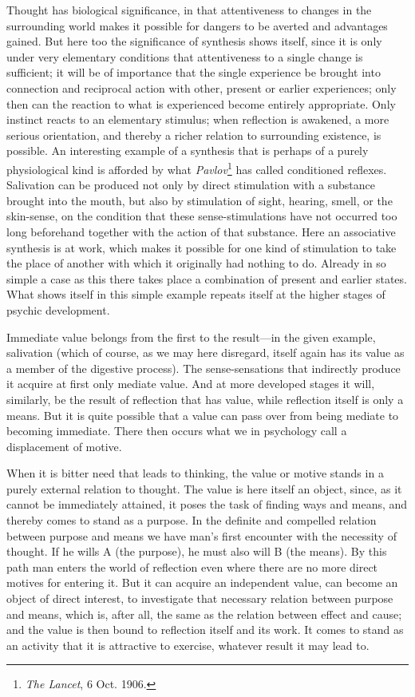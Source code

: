 \documentclass[12pt,a4paper]{book}
\newcommand{\opage}[1]{\marginnote{\footnotesize\textit{[#1]}}}
\begin{document}
Thought has biological significance, in that attentiveness to changes in
the surrounding world makes it possible for dangers to be averted and
advantages gained. But here too the significance of synthesis shows
itself, since it is only under very elementary conditions that
attentiveness to a single change is sufficient; it will be of importance
that the single experience be brought into connection and reciprocal
action with other, present or earlier experiences; only then can the
reaction to what is experienced become entirely appropriate. Only
instinct reacts to an elementary stimulus; when reflection is awakened,
a more serious orientation, and thereby a richer relation to surrounding
existence, is possible. An interesting example of a synthesis that is
perhaps of a purely physiological kind is afforded by what
\emph{Pavlov}\footnote{\emph{The Lancet}, 6 Oct. 1906.} has called
conditioned reflexes. Salivation can be produced not only by direct
stimulation with a substance brought into the mouth, but also by
stimulation of sight, hearing, \opage{21}smell, or the skin-sense, on the
condition that these sense-stimulations have not occurred too long
beforehand together with the action of that substance. Here an
associative synthesis is at work, which makes it possible for one kind
of stimulation to take the place of another with which it originally had
nothing to do. Already in so simple a case as this there takes place a
combination of present and earlier states. What shows itself in this
simple example repeats itself at the higher stages of psychic
development.

Immediate value belongs from the first to the result---in the given
example, salivation (which of course, as we may here disregard, itself
again has its value as a member of the digestive process). The
sense-sensations that indirectly produce it acquire at first only
mediate value. And at more developed stages it will, similarly, be the
result of reflection that has value, while reflection itself is only a
means. But it is quite possible that a value can pass over from being
mediate to becoming immediate. There then occurs what we in psychology
call a displacement of motive.

When it is bitter need that leads to thinking, the value or motive
stands in a purely external relation to thought. The value is here
itself an object, since, as it cannot be immediately attained, it poses
the task of finding ways and means, and thereby comes to stand as a
purpose. In the definite and compelled relation between purpose and
means we have man's first encounter with the necessity of thought. If he
wills A (the purpose), he must also will B (the means). By this path man
enters the world of reflection even where there are no more direct
motives for entering it. But it can acquire an independent value, can
become an object of direct interest, to investigate that necessary
relation between purpose and means, which is, after all, the same as the
relation between effect and cause; and the value is then bound to
reflection itself and its work. It comes to stand as an activity that it
is attractive to exercise, whatever result it may lead to.
\end{document}
